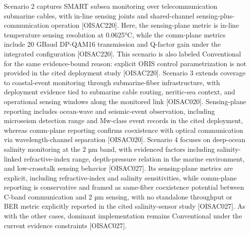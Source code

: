 {}Scenario 2 captures SMART subsea monitoring over telecommunication submarine cables, with in-line sensing joints and shared-channel sensing-plus-communication operation [O\markdownRendererUnderscore{}ISAC\markdownRendererUnderscore{}220]. Here, the sensing-plane metric is in-line temperature sensing resolution at 0.0625°C, while the comm-plane metrics include 20 GBaud DP-QAM16 transmission and Q-factor gain under the integrated configuration [O\markdownRendererUnderscore{}ISAC\markdownRendererUnderscore{}220]. This scenario is also labeled Conventional for the same evidence-bound reason: explicit ORIS control parametrization is not provided in the cited deployment study [O\markdownRendererUnderscore{}ISAC\markdownRendererUnderscore{}220].\markdownRendererInterblockSeparator
{}
\markdownRendererSectionEnd \markdownRendererSectionBegin
{}\markdownRendererInterblockSeparator
{}Scenario 3 extends coverage to coastal-event monitoring through submarine-fiber infrastructure, with deployment evidence tied to submarine cable routing, neritic-sea context, and operational sensing windows along the monitored link [O\markdownRendererUnderscore{}ISAC\markdownRendererUnderscore{}020]. Sensing-plane reporting includes ocean-wave and seismic-event observation, including microseism detection range and Mw-class event records in the cited deployment, whereas comm-plane reporting confirms coexistence with optical communication via wavelength-channel separation [O\markdownRendererUnderscore{}ISAC\markdownRendererUnderscore{}020].\markdownRendererParagraphSeparator
{}Scenario 4 focuses on deep-ocean salinity monitoring at the 2 µm band, with evidenced factors including salinity-linked refractive-index range, depth-pressure relation in the marine environment, and low-crosstalk sensing behavior [O\markdownRendererUnderscore{}ISAC\markdownRendererUnderscore{}027]. Its sensing-plane metrics are explicit, including refractive-index and salinity sensitivities, while comm-plane reporting is conservative and framed as same-fiber coexistence potential between C-band communication and 2 µm sensing, with no standalone throughput or BER metric explicitly reported in the cited salinity-sensor study [O\markdownRendererUnderscore{}ISAC\markdownRendererUnderscore{}027]. As with the other cases, dominant implementation remains Conventional under the current evidence constraints [O\markdownRendererUnderscore{}ISAC\markdownRendererUnderscore{}027].\markdownRendererInterblockSeparator
{}
\markdownRendererSectionEnd \markdownRendererSectionBegin
{}\markdownRendererInterblockSeparator
